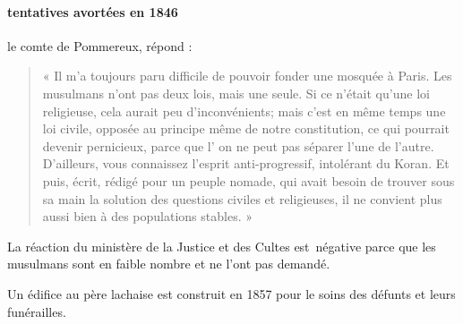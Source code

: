 \paragraph{tentatives avortées en 1846}
le comte de Pommereux, répond : 
\begin{quote}
« Il m'a
toujours paru difficile de pouvoir fonder une mosquée à Paris. Les
musulmans n'ont pas deux lois, mais une seule. Si ce n'était
qu'une loi religieuse, cela aurait peu d'inconvénients; mais c'est
en même temps une loi civile, opposée au principe même de notre
constitution, ce qui pourrait devenir pernicieux, parce que l' on ne
peut pas séparer l'une de l'autre. D'ailleurs, vous connaissez
l'esprit anti-progressif, intolérant du Koran. Et puis, écrit, rédigé
pour un peuple nomade, qui avait besoin de trouver sous sa main
la solution des questions civiles et religieuses, il ne convient plus
aussi bien à des populations stables. »
\end{quote}
La réaction du ministère de la Justice et des Cultes est~négative parce que les musulmans sont en faible nombre et ne l'ont pas demandé.

Un édifice au père lachaise est construit en 1857 pour le soins des défunts et leurs funérailles.

